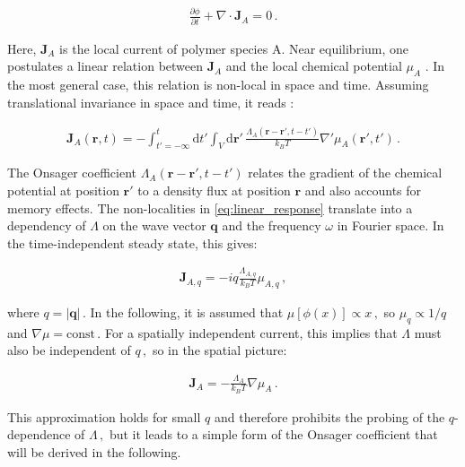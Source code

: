 \documentclass[bachelor,       %
               twoside,        %
               BCOR10mm,       %
               ngerman, english %
               ]{GAUBM}
\begin{document}
\begin{align}
  \frac{\partial\phi}{\partial t}+\nabla\cdot\mathbf{J}_A=0\,.
  \label{eq:conti}
\end{align}

Here, $\mathbf{J}_A$ is the local current of polymer species A. Near equilibrium, one postulates a linear relation between $\mathbf{J}_A$ and the local chemical potential $\mu_A$ \cite{deGennes80}. In the most general case, this relation is non-local in space and time. Assuming translational invariance in space and time, it reads \cite{erukhimovich1986nonexponential}:


\begin{align}
    \mathbf{J}_A(\mathbf{r},t)=-\int_{t'=-\infty}^t\mathrm d t'\int_V\mathrm d \mathbf{r'}\,\frac{\Lambda_A(\mathbf{r}- \mathbf{r'},t-t')}{k_BT}\nabla '\mu_A(\mathbf{r'},t')\,.
    \label{eq:linear_response}
\end{align}

The Onsager coefficient $\Lambda_A(\mathbf{r}- \mathbf{r'},t-t')$ relates the gradient of the chemical potential at position $\mathbf{r'}$ to a density flux at position $\mathbf r$ and also accounts for memory effects. The non-localities in \eqref{eq:linear_response} translate into a dependency of $\Lambda$ on the wave vector $\mathbf q$ and the frequency $\omega$ in Fourier space. In the time-independent steady state, this gives:


\begin{align}
    \mathbf {J}_{A, q}=-iq\frac{\Lambda_{A, q}}{k_BT}\mu_{A, q}\,,
\end{align}

where $q=|\mathbf q|\,.$ In the following, it is assumed that $\mu[\phi(x)]\propto x\,,$ so $\mu_q\propto 1/q$ and $\nabla\mu=\mathrm{const}\,.$ For a spatially independent current, this implies that $\Lambda$ must also be independent of $q\,,$ so in the spatial picture: 


\begin{align}
    \mathbf {J}_A=-\frac{\Lambda_A}{k_BT}\nabla\mu_A\,.
    \label{eq:current_local}
\end{align}


This approximation holds for small $q$ and therefore prohibits the probing of the $q$-dependence of $\Lambda\,,$ but it leads to a simple form of the Onsager coefficient that will be derived in the following. 


\end{document}
